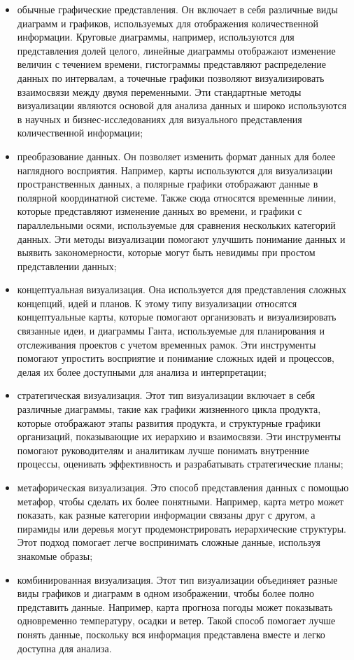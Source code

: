 \begin{itemize}
	\item обычные графические представления. Он включает в себя различные виды диаграмм и графиков, используемых для отображения количественной информации. Круговые диаграммы, например, используются для представления долей целого, линейные диаграммы отображают изменение величин с течением времени, гистограммы представляют распределение данных по интервалам, а точечные графики позволяют визуализировать взаимосвязи между двумя переменными. Эти стандартные методы визуализации являются основой для анализа данных и широко используются в научных и бизнес-исследованиях для визуального представления количественной информации;
	\item преобразование данных. Он позволяет изменить формат данных для более наглядного восприятия. Например, карты используются для визуализации пространственных данных, а полярные графики отображают данные в полярной координатной системе. Также сюда относятся временные линии, которые представляют изменение данных во времени, и графики с параллельными осями, используемые для сравнения нескольких категорий данных. Эти методы визуализации помогают улучшить понимание данных и выявить закономерности, которые могут быть невидимы при простом представлении данных;
	\item концептуальная визуализация. Она используется для представления сложных концепций, идей и планов. К этому типу визуализации относятся концептуальные карты, которые помогают организовать и визуализировать связанные идеи, и диаграммы Ганта, используемые для планирования и отслеживания проектов с учетом временных рамок. Эти инструменты помогают упростить восприятие и понимание сложных идей и процессов, делая их более доступными для анализа и интерпретации;
	\item стратегическая визуализация. Этот тип визуализации включает в себя различные диаграммы, такие как графики жизненного цикла продукта, которые отображают этапы развития продукта, и структурные графики организаций, показывающие их иерархию и взаимосвязи. Эти инструменты помогают руководителям и аналитикам лучше понимать внутренние процессы, оценивать эффективность и разрабатывать стратегические планы;
	\item метафорическая визуализация. Это способ представления данных с помощью метафор, чтобы сделать их более понятными. Например, карта метро может показать, как разные категории информации связаны друг с другом, а пирамиды или деревья могут продемонстрировать иерархические структуры. Этот подход помогает легче воспринимать сложные данные, используя знакомые образы;
	\item комбинированная визуализация. Этот тип визуализации объединяет разные виды графиков и диаграмм в одном изображении, чтобы более полно представить данные. Например, карта прогноза погоды может показывать одновременно температуру, осадки и ветер. Такой способ помогает лучше понять данные, поскольку вся информация представлена вместе и легко доступна для анализа.
\end{itemize}

